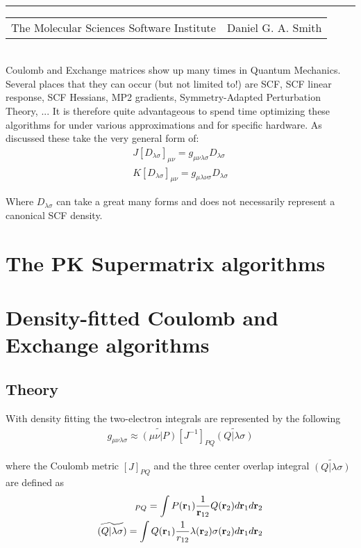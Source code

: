 \documentclass[aip,jcp,preprint,superscriptaddress,floatfix]{revtex4-1}
\renewcommand{\title}[1]{\textbf{\large{#1}}\\}
\newcommand{\leftright}[2]{\begin{tabularx}{\textwidth}{X>{\raggedleft}X}#1%
& #2\\\end{tabularx}\\[-1cm]}
\begin{document}
\title{}
\rule{\textwidth}{1pt}
\leftright{The Molecular Sciences Software Institute}{Daniel G. A. Smith} %

\bigskip
Coulomb and Exchange matrices show up many times in Quantum Mechanics. Several places that they can occur (but not limited to!) are SCF, SCF linear response, SCF Hessians, MP2 gradients, Symmetry-Adapted Perturbation Theory, ... It is therefore quite advantageous to spend time optimizing these algorithms for under various approximations and for specific hardware. As discussed these take the very general form of:
\begin{eqnarray}
J[D_{\lambda \sigma}]_{\mu \nu} =   g_{\mu \nu \lambda \sigma} D_{\lambda \sigma}\\
K[D_{\lambda \sigma}]_{\mu \nu} =   g_{\mu \lambda \nu \sigma} D_{\lambda \sigma} 
\end{eqnarray}

Where $D_{\lambda \sigma}$ can take a great many forms and does not necessarily represent a canonical SCF density.


\section{The PK Supermatrix algorithms}

\section{Density-fitted Coulomb and Exchange algorithms}

\subsection{Theory}
With density fitting\cite{Weigend:2002ga, Vahtras:1993db, Dunlap:1979gh, Whitten:1973ju} the two-electron integrals are represented by the following
\begin{eqnarray}
g_{\mu \nu \lambda \sigma} \approx \widetilde{(\mu \nu |P)} [J^{-1}]_{PQ} \widetilde{(Q| \lambda \sigma)}
\end{eqnarray}


where the Coulomb metric $[J]_{PQ}$ and the three center overlap integral $\widetilde{(Q| \lambda \sigma)} $ are defined as
\begin{eqnarray}
[J]_{PQ} = \int P({\bf r}_1) \frac{1}{{\bf r}_{12}}Q({\bf r}_2)d{\bf r}_1d{\bf r}_2\\
\widetilde{(Q| \lambda \sigma)} = \int Q({\bf r}_1)\frac{1}{r_{12}} \lambda({\bf r}_2) \sigma({\bf r}_2)d{\bf r}_1d{\bf r}_2
\end{eqnarray}
\end{document}
